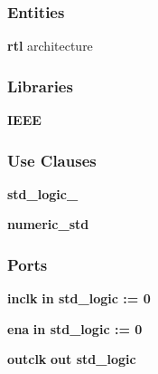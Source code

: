 \subsubsection*{Entities}
\begin{DoxyCompactItemize}
\item 
{\bf rtl} architecture
\end{DoxyCompactItemize}
\subsubsection*{Libraries}
 \begin{DoxyCompactItemize}
\item 
{\bf I\+E\+EE} 
\end{DoxyCompactItemize}
\subsubsection*{Use Clauses}
 \begin{DoxyCompactItemize}
\item 
{\bf std\+\_\+logic\+\_}   
\item 
{\bf numeric\+\_\+std}   
\end{DoxyCompactItemize}
\subsubsection*{Ports}
 \begin{DoxyCompactItemize}
\item 
{\bf inclk}  {\bfseries {\bfseries \textcolor{keywordflow}{in}\textcolor{vhdlchar}{ }}} {\bfseries \textcolor{comment}{std\+\_\+logic}\textcolor{vhdlchar}{ }\textcolor{vhdlchar}{ }\textcolor{vhdlchar}{\+:}\textcolor{vhdlchar}{=}\textcolor{vhdlchar}{ }\textcolor{vhdlchar}{ }\textcolor{vhdlchar}{\textquotesingle{}}\textcolor{vhdlchar}{ } \textcolor{vhdldigit}{0} \textcolor{vhdlchar}{ }\textcolor{vhdlchar}{\textquotesingle{}}\textcolor{vhdlchar}{ }} 
\item 
{\bf ena}  {\bfseries {\bfseries \textcolor{keywordflow}{in}\textcolor{vhdlchar}{ }}} {\bfseries \textcolor{comment}{std\+\_\+logic}\textcolor{vhdlchar}{ }\textcolor{vhdlchar}{ }\textcolor{vhdlchar}{\+:}\textcolor{vhdlchar}{=}\textcolor{vhdlchar}{ }\textcolor{vhdlchar}{ }\textcolor{vhdlchar}{\textquotesingle{}}\textcolor{vhdlchar}{ } \textcolor{vhdldigit}{0} \textcolor{vhdlchar}{ }\textcolor{vhdlchar}{\textquotesingle{}}\textcolor{vhdlchar}{ }} 
\item 
{\bf outclk}  {\bfseries {\bfseries \textcolor{keywordflow}{out}\textcolor{vhdlchar}{ }}} {\bfseries \textcolor{comment}{std\+\_\+logic}\textcolor{vhdlchar}{ }} 
\end{DoxyCompactItemize}


